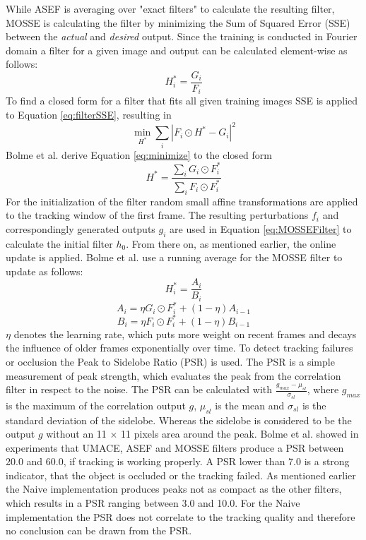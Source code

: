 While ASEF is averaging over "exact filters" to calculate the resulting filter, MOSSE is calculating the filter by minimizing the Sum of Squared Error (SSE) between the \emph{actual} and \emph{desired} output.
Since the training is conducted in Fourier domain a filter for a given image and output can be calculated element-wise as follows:
\begin{equation}\label{eq:filterSSE}
H^{*}_i = \frac{G_i}{F_i}
\end{equation}
To find a closed form for a filter that fits all given training images SSE is applied to Equation \ref{eq:filterSSE}, resulting in 
\begin{equation}\label{eq:minimize}
\min_{H^*} \sum_{i} |F_i \odot H^* - G_i|^2 
\end{equation}
Bolme et al. derive Equation \ref{eq:minimize} to the closed form 
\begin{equation}\label{eq:MOSSEFilter}
H^* = \frac{\sum_i G_i \odot F^*_i}{\sum_i F_i \odot F^*_i}
\end{equation}
For the initialization of the filter random small affine transformations are applied 
to the tracking window of the first frame. The resulting  perturbations $f_i$ and correspondingly generated outputs $g_i$ are used in Equation \ref{eq:MOSSEFilter} to calculate the initial filter $h_0$. From there on, as mentioned earlier, the online update is applied. Bolme et al. use a running average for the MOSSE filter to update as follows:
\begin{equation}
H^*_i = \frac{A_i}{B_i}
\end{equation}
\begin{equation}
A_i = \eta G_i \odot F^*_i + (1-\eta)A_{i-1}
\end{equation}
\begin{equation}
B_i = \eta F_i \odot F^*_i + (1-\eta)B_{i-1}
\end{equation}
$\eta$ denotes the learning rate, which puts more weight on recent frames and decays the influence of older frames exponentially over time.
To detect tracking failures or occlusion the Peak to Sidelobe Ratio (PSR) is used. The PSR is a simple measurement of peak strength, which evaluates the peak from the correlation filter in respect to the noise. 
The PSR can be calculated with $\frac{g_{max} - \mu_{sl}}{\sigma_{sl}}$, where $g_{max}$ is the maximum of the correlation output $g$, $\mu_{sl}$ is the mean and $\sigma_{sl}$ is the standard deviation of the sidelobe. 
Whereas the sidelobe is considered to be the output $g$ without an 11 $\times$ 11 pixels area around the peak.
Bolme et al. showed in experiments that UMACE, ASEF and MOSSE filters produce a PSR between 20.0 and 60.0, if tracking is working properly. 
A PSR lower than 7.0 is a strong indicator, that the object is occluded or the tracking failed.
As mentioned earlier the Naive implementation produces peaks not as compact as the other filters, which results in a PSR ranging between 3.0 and 10.0. For the Naive implementation the PSR does not correlate to the tracking quality and therefore no conclusion can be drawn from the PSR.

